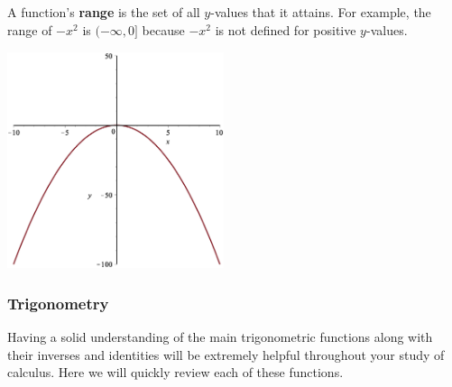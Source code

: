 \documentclass[oneside]{article}
\begin{document}
A function's \textbf{range} is the set of all $y$-values that it attains. For example, the range of $-x^2$ is $(-\infty,0]$ because $-x^2$ is not defined for positive $y$-values. 

\begin{center}
\includegraphics[width=2.5in, height=2.5in]{img/x2_range.eps} \\
\end{center}

\subsubsection{Trigonometry}
Having a solid understanding of the main trigonometric functions along with their inverses and identities will be extremely helpful throughout your study of calculus. Here we will quickly review each of these functions. \\
\end{document}
